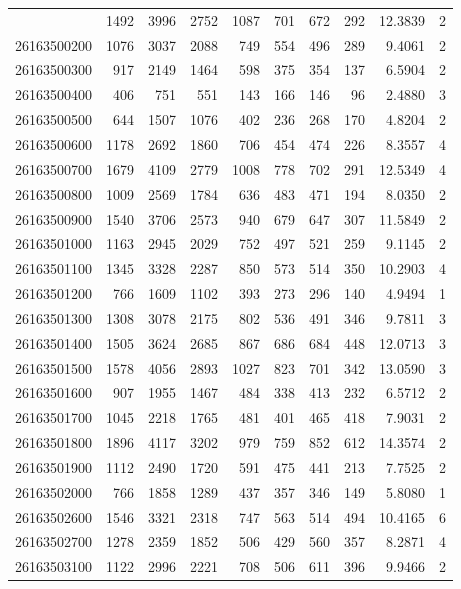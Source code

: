 \documentclass[
  11pt,
]{article}
\begin{document}
\begin{longtable}[t]{lrrrrrrrrr}
\endfoot
\bottomrule
\endlastfoot
26163500100 & 1492 & 3996 & 2752 & 1087 & 701 & 672 & 292 & 12.3839 & 2\\
26163500200 & 1076 & 3037 & 2088 & 749 & 554 & 496 & 289 & 9.4061 & 2\\
26163500300 & 917 & 2149 & 1464 & 598 & 375 & 354 & 137 & 6.5904 & 2\\
26163500400 & 406 & 751 & 551 & 143 & 166 & 146 & 96 & 2.4880 & 3\\
26163500500 & 644 & 1507 & 1076 & 402 & 236 & 268 & 170 & 4.8204 & 2\\
26163500600 & 1178 & 2692 & 1860 & 706 & 454 & 474 & 226 & 8.3557 & 4\\
26163500700 & 1679 & 4109 & 2779 & 1008 & 778 & 702 & 291 & 12.5349 & 4\\
26163500800 & 1009 & 2569 & 1784 & 636 & 483 & 471 & 194 & 8.0350 & 2\\
26163500900 & 1540 & 3706 & 2573 & 940 & 679 & 647 & 307 & 11.5849 & 2\\
26163501000 & 1163 & 2945 & 2029 & 752 & 497 & 521 & 259 & 9.1145 & 2\\
26163501100 & 1345 & 3328 & 2287 & 850 & 573 & 514 & 350 & 10.2903 & 4\\
26163501200 & 766 & 1609 & 1102 & 393 & 273 & 296 & 140 & 4.9494 & 1\\
26163501300 & 1308 & 3078 & 2175 & 802 & 536 & 491 & 346 & 9.7811 & 3\\
26163501400 & 1505 & 3624 & 2685 & 867 & 686 & 684 & 448 & 12.0713 & 3\\
26163501500 & 1578 & 4056 & 2893 & 1027 & 823 & 701 & 342 & 13.0590 & 3\\
26163501600 & 907 & 1955 & 1467 & 484 & 338 & 413 & 232 & 6.5712 & 2\\
26163501700 & 1045 & 2218 & 1765 & 481 & 401 & 465 & 418 & 7.9031 & 2\\
26163501800 & 1896 & 4117 & 3202 & 979 & 759 & 852 & 612 & 14.3574 & 2\\
26163501900 & 1112 & 2490 & 1720 & 591 & 475 & 441 & 213 & 7.7525 & 2\\
26163502000 & 766 & 1858 & 1289 & 437 & 357 & 346 & 149 & 5.8080 & 1\\
26163502600 & 1546 & 3321 & 2318 & 747 & 563 & 514 & 494 & 10.4165 & 6\\
26163502700 & 1278 & 2359 & 1852 & 506 & 429 & 560 & 357 & 8.2871 & 4\\
26163503100 & 1122 & 2996 & 2221 & 708 & 506 & 611 & 396 & 9.9466 & 2\\

\end{longtable}
\end{document}
